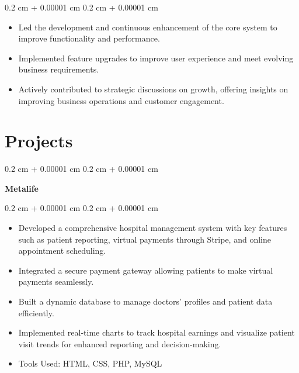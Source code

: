 \documentclass[10pt, letterpaper]{article}
\newenvironment{highlights}{
    \begin{itemize}[
        topsep=0.10 cm,
        parsep=0.10 cm,
        partopsep=0pt,
        itemsep=0pt,
        leftmargin=0.4 cm + 10pt
    ]
}{
    \end{itemize}
} %
\newenvironment{onecolentry}{
    \begin{adjustwidth}{
        0.2 cm + 0.00001 cm
    }{
        0.2 cm + 0.00001 cm
    }
}{
    \end{adjustwidth}
} %
\begin{document}
        \vspace{0.10 cm}
        \begin{onecolentry}
            \begin{highlights}
                \item Led the development and continuous enhancement of the core system to improve functionality and performance.
                \item Implemented feature upgrades to improve user experience and meet evolving business requirements.
                \item Actively contributed to strategic discussions on growth, offering insights on improving business operations and customer engagement.
            \end{highlights}
        \end{onecolentry}



    
    \section{Projects}



        
        \begin{onecolentry}
            \textbf{Metalife}
        \end{onecolentry}

        \vspace{0.10 cm}
        \begin{onecolentry}
            \begin{highlights}
                \item Developed a comprehensive hospital management system with key features such as patient reporting, virtual payments through Stripe, and online appointment scheduling.
                \item Integrated a secure payment gateway allowing patients to make virtual payments seamlessly.
                \item Built a dynamic database to manage doctors’ profiles and patient data efficiently.
                \item Implemented real-time charts to track hospital earnings and visualize patient visit trends for enhanced reporting and decision-making.
                \item Tools Used: HTML, CSS, PHP, MySQL
            \end{highlights}
        \end{onecolentry}
\end{document}
